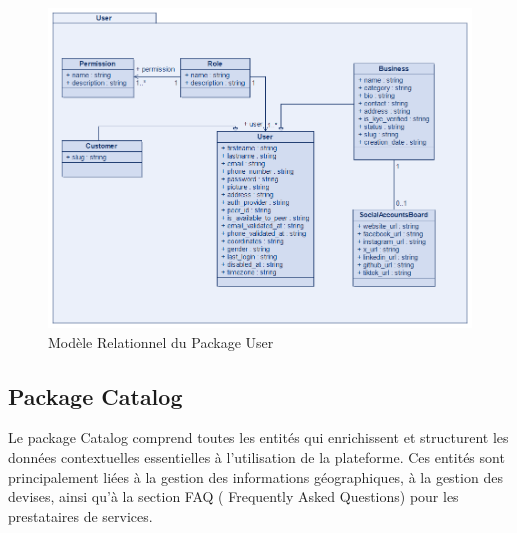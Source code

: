 \begin{figure}[H]
\begin{center}
\includegraphics[width=15cm]{assets/diagrams/UserPackage.png}
\end{center}
\caption{Modèle Relationnel du Package User}
\end{figure}
\vspace{0.35cm}

\newpage

\subsection{Package Catalog}
Le package Catalog comprend toutes les entités qui enrichissent et structurent les données contextuelles essentielles à l'utilisation de la plateforme. Ces entités sont principalement liées à la gestion des informations géographiques, à la gestion des devises, ainsi qu'à la section FAQ ( Frequently Asked Questions) pour les prestataires de services. 

